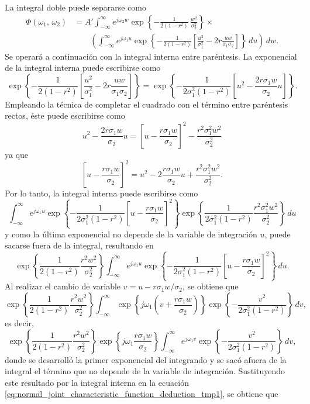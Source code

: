 \documentclass[a4paper]{report}
\begin{document}
La integral doble puede separarse como
\begin{equation}\label{eq:normal_joint_characteristic_function_deduction_tmp1}
 \begin{aligned}
 \Phi(\omega_1,\,\omega_2)&=A'\int_{-\infty}^{\infty}e^{j\omega_2w}\exp\left\{-\frac{1}{2(1-r^2)}\,\frac{w^2}{\sigma_2^2}\right\}\times\\
 &\qquad\left(\int_{-\infty}^{\infty}e^{j\omega_1u}
 \exp\left\{-\frac{1}{2(1-r^2)}\left[\frac{u^2}{\sigma_1^2}-2r\frac{uw}{\sigma_1\sigma_2}\right]\right\}\,du\right)\,dw.
\end{aligned}
\end{equation}
Se operará a continuación con la integral interna entre paréntesis. La exponencial de la integral interna puede escribirse como
\[ 
 \exp\left\{-\frac{1}{2(1-r^2)}\left[\frac{u^2}{\sigma_1^2}-2r\frac{uw}{\sigma_1\sigma_2}\right]\right\}=
 \exp\left\{-\frac{1}{2\sigma_1^2(1-r^2)}\left[u^2-\frac{2r\sigma_1w}{\sigma_2}u\right]\right\}.
\]
Empleando la técnica de completar el cuadrado con el término entre paréntesis rectos, éste puede escribirse como
\[
 u^2-\frac{2r\sigma_1w}{\sigma_2}u=\left[u-\frac{r\sigma_1w}{\sigma_2}\right]^2-\frac{r^2\sigma_1^2w^2}{\sigma_2^2}
\]
ya que
\[
 \left[u-\frac{r\sigma_1w}{\sigma_2}\right]^2=u^2-2\frac{r\sigma_1w}{\sigma_2}u+\frac{r^2\sigma_1^2w^2}{\sigma_2^2}.
\]
Por lo tanto, la integral interna puede escribirse como
\[
 \int_{-\infty}^{\infty}e^{j\omega_1u}
 \exp\left\{-\frac{1}{2\sigma_1^2(1-r^2)}\left[u-\frac{r\sigma_1w}{\sigma_2}\right]^2\right\}\exp\left\{\frac{1}{2\sigma_1^2(1-r^2)}\frac{r^2\sigma_1^2w^2}{\sigma_2^2}\right\}\,du
\]
y como la última exponencial no depende de la variable de integración \(u\), puede sacarse fuera de la integral, resultando en
\[
 \exp\left\{\frac{1}{2(1-r^2)}\frac{r^2w^2}{\sigma_2^2}\right\}\int_{-\infty}^{\infty}e^{j\omega_1u}
 \exp\left\{-\frac{1}{2\sigma_1^2(1-r^2)}\left[u-\frac{r\sigma_1w}{\sigma_2}\right]^2\right\}\,du.
\]
Al realizar el cambio de variable \(v=u-r\sigma_1w/\sigma_2\), se obtiene que
\[
 \exp\left\{\frac{1}{2(1-r^2)}\frac{r^2w^2}{\sigma_2^2}\right\}\int_{-\infty}^{\infty}\exp\left\{j\omega_1\left(v+\frac{r\sigma_1w}{\sigma_2}\right)\right\}
 \exp\left\{-\frac{v^2}{2\sigma_1^2(1-r^2)}\right\}\,dv,
\]
es decir,
\[
 \exp\left\{\frac{1}{2(1-r^2)}\frac{r^2w^2}{\sigma_2^2}\right\}\exp\left\{j\omega_1\frac{r\sigma_1w}{\sigma_2}\right\}\int_{-\infty}^{\infty}e^{j\omega_1v}
 \exp\left\{-\frac{v^2}{2\sigma_1^2(1-r^2)}\right\}\,dv,
\]
donde se desarrolló la primer exponencial del integrando y se sacó afuera de la integral el término que no depende de la variable de integración. Sustituyendo este resultado por la integral interna en la ecuación \ref{eq:normal_joint_characteristic_function_deduction_tmp1}, se obtiene que
\end{document}

